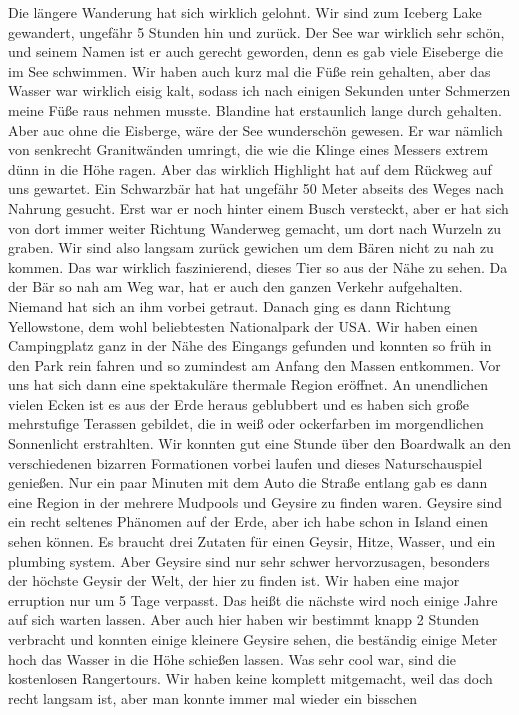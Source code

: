 \documentclass[11pt]{book}
\begin{document}
Die längere Wanderung hat sich wirklich gelohnt. Wir sind zum Iceberg Lake gewandert, ungefähr 5 Stunden hin und zurück. Der See war wirklich sehr schön, 
und seinem Namen ist er auch gerecht geworden, denn es gab viele Eiseberge die im See schwimmen. Wir haben auch kurz mal die Füße rein gehalten, aber das 
Wasser war wirklich eisig kalt, sodass ich nach einigen Sekunden unter Schmerzen meine Füße raus nehmen musste. Blandine hat erstaunlich lange durch 
gehalten. Aber auc ohne die Eisberge, wäre der See wunderschön gewesen. Er war nämlich von senkrecht Granitwänden umringt, die wie die Klinge eines 
Messers extrem dünn in die Höhe ragen. Aber das wirklich Highlight hat auf dem Rückweg auf uns gewartet. Ein Schwarzbär hat hat ungefähr 50 Meter abseits 
des Weges nach Nahrung gesucht. Erst war er noch hinter einem Busch versteckt, aber er hat sich von dort immer weiter Richtung Wanderweg gemacht, 
um dort nach Wurzeln zu graben. Wir sind also langsam zurück gewichen um dem Bären nicht zu nah zu kommen. Das war wirklich faszinierend, dieses Tier 
so aus der Nähe zu sehen. Da der Bär so nah am Weg war, hat er auch den ganzen Verkehr aufgehalten. Niemand hat sich an ihm vorbei getraut. 
Danach ging es dann Richtung Yellowstone, dem wohl beliebtesten Nationalpark der USA. Wir haben einen Campingplatz ganz in der Nähe des Eingangs gefunden 
und konnten so früh in den Park rein fahren und so zumindest am Anfang den Massen entkommen. Vor uns hat sich dann eine spektakuläre thermale Region 
eröffnet. An unendlichen vielen Ecken ist es aus der Erde heraus geblubbert und es haben sich große mehrstufige Terassen gebildet, die in weiß oder ockerfarben 
im morgendlichen Sonnenlicht erstrahlten. Wir konnten gut eine Stunde über den Boardwalk an den verschiedenen bizarren Formationen vorbei laufen und dieses 
Naturschauspiel genießen. Nur ein paar Minuten mit dem Auto die Straße entlang gab es dann eine Region in der mehrere Mudpools und Geysire zu finden waren. 
Geysire sind ein recht seltenes Phänomen auf der Erde, aber ich habe schon in Island einen sehen können. Es braucht drei Zutaten für einen Geysir, Hitze, Wasser, 
und ein plumbing system. Aber Geysire sind nur sehr schwer hervorzusagen, besonders der höchste Geysir der Welt, der hier zu finden ist. Wir haben eine 
major erruption nur um 5 Tage verpasst. Das heißt die nächste wird noch einige Jahre auf sich warten lassen. Aber auch hier haben wir bestimmt knapp 2 
Stunden verbracht und konnten einige kleinere Geysire sehen, die beständig einige Meter hoch das Wasser in die Höhe schießen lassen. Was sehr cool 
war, sind die kostenlosen Rangertours. Wir haben keine komplett mitgemacht, weil das doch recht langsam ist, aber man konnte immer mal wieder ein bisschen 
\end{document}
